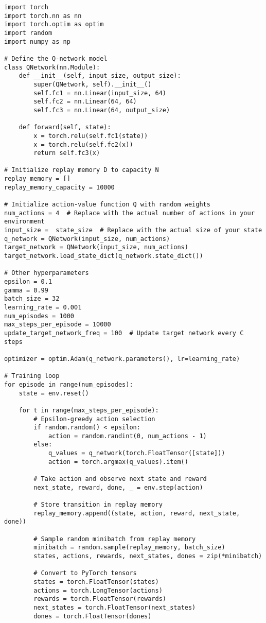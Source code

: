 \documentclass{article}
\begin{document}
\begin{lstlisting}
import torch
import torch.nn as nn
import torch.optim as optim
import random
import numpy as np

# Define the Q-network model
class QNetwork(nn.Module):
    def __init__(self, input_size, output_size):
        super(QNetwork, self).__init__()
        self.fc1 = nn.Linear(input_size, 64)
        self.fc2 = nn.Linear(64, 64)
        self.fc3 = nn.Linear(64, output_size)

    def forward(self, state):
        x = torch.relu(self.fc1(state))
        x = torch.relu(self.fc2(x))
        return self.fc3(x)

# Initialize replay memory D to capacity N
replay_memory = []
replay_memory_capacity = 10000

# Initialize action-value function Q with random weights
num_actions = 4  # Replace with the actual number of actions in your environment
input_size =  state_size  # Replace with the actual size of your state
q_network = QNetwork(input_size, num_actions)
target_network = QNetwork(input_size, num_actions)
target_network.load_state_dict(q_network.state_dict())

# Other hyperparameters
epsilon = 0.1
gamma = 0.99
batch_size = 32
learning_rate = 0.001
num_episodes = 1000
max_steps_per_episode = 10000
update_target_network_freq = 100  # Update target network every C steps

optimizer = optim.Adam(q_network.parameters(), lr=learning_rate)

# Training loop
for episode in range(num_episodes):
    state = env.reset()

    for t in range(max_steps_per_episode):
        # Epsilon-greedy action selection
        if random.random() < epsilon:
            action = random.randint(0, num_actions - 1)
        else:
            q_values = q_network(torch.FloatTensor([state]))
            action = torch.argmax(q_values).item()

        # Take action and observe next state and reward
        next_state, reward, done, _ = env.step(action)

        # Store transition in replay memory
        replay_memory.append((state, action, reward, next_state, done))

        # Sample random minibatch from replay memory
        minibatch = random.sample(replay_memory, batch_size)
        states, actions, rewards, next_states, dones = zip(*minibatch)

        # Convert to PyTorch tensors
        states = torch.FloatTensor(states)
        actions = torch.LongTensor(actions)
        rewards = torch.FloatTensor(rewards)
        next_states = torch.FloatTensor(next_states)
        dones = torch.FloatTensor(dones)


\end{lstlisting}
\end{document}
